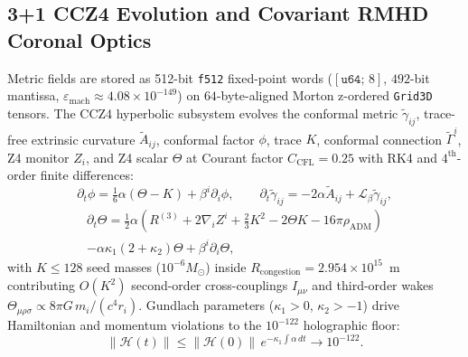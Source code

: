 \documentclass[twocolumn,aps,pra,floatfix,superscriptaddress,10pt]{revtex4-2}
\begin{document}
\subsection{3+1 CCZ4 Evolution and Covariant RMHD Coronal Optics}
\label{subsec:ccz4_rmhd}

Metric fields are stored as 512-bit \texttt{f512} fixed-point words ($[\texttt{u64};\,8]$,
$492$-bit mantissa, $\varepsilon_{\text{mach}} \approx 4.08 \times 10^{-149}$) on
$64$-byte-aligned Morton z-ordered \texttt{Grid3D} tensors. The CCZ4 hyperbolic
subsystem evolves the conformal metric $\tilde{\gamma}_{ij}$, trace-free extrinsic
curvature $\tilde{A}_{ij}$, conformal factor $\phi$, trace $K$, conformal connection
$\tilde{\Gamma}^{i}$, Z4 monitor $Z_i$, and Z4 scalar $\Theta$ at Courant factor
$C_{\text{CFL}} = 0.25$ with RK4 and $4^{\text{th}}$-order finite differences:
\begin{equation}
\partial_t \phi = \tfrac{1}{6} \alpha (\Theta - K) + \beta^i \partial_i \phi, \qquad
\partial_t \tilde{\gamma}_{ij} = -2\alpha \tilde{A}_{ij} + \mathcal{L}_\beta \tilde{\gamma}_{ij},
\label{eq:ccz4_phi_gamma}
\end{equation}
\begin{multline}
\partial_t \Theta = \tfrac{1}{2} \alpha \left( R^{(3)} + 2\nabla_i Z^i + \tfrac{2}{3} K^2 - 2 \Theta K - 16\pi \rho_{\text{ADM}} \right) \\ - \alpha \kappa_1 (2 + \kappa_2) \Theta + \beta^i \partial_i \Theta,
\label{eq:ccz4_theta}
\end{multline}
with $K \le 128$ seed masses ($10^{-6} M_\odot$) inside $R_{\text{congestion}} =
2.954 \times 10^{15}$~m contributing $O(K^2)$ second-order cross-couplings
$I_{\mu\nu}$ and third-order wakes $\Theta_{\mu\rho\sigma} \propto 8\pi G\, m_i /
(c^4 r_i)$. Gundlach parameters ($\kappa_1 > 0$, $\kappa_2 > -1$) drive Hamiltonian
and momentum violations to the $10^{-122}$ holographic floor:
\begin{equation}
\|\mathcal{H}(t)\| \le \|\mathcal{H}(0)\|\, e^{-\kappa_1 \int \alpha\, dt} \to 10^{-122}.
\label{eq:gundlach}
\end{equation}
\end{document}
